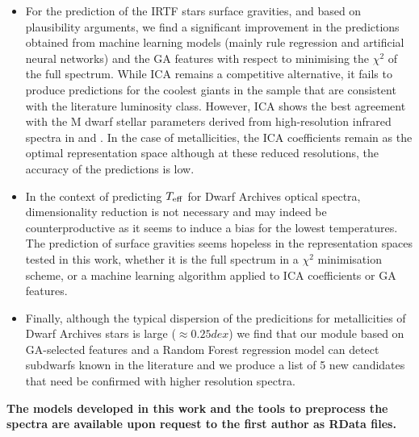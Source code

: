 \begin{itemize}
\item For the prediction of the IRTF stars surface gravities, and
  based on plausibility arguments, we find a significant improvement
  in the predictions obtained from machine learning models (mainly
  rule regression and artificial neural networks) and the GA features
  with respect to minimising the $\chi^2$ of the full spectrum. While
  ICA remains a competitive alternative, it fails to produce
  predictions for the coolest giants in the sample that are consistent
  with the literature luminosity class. However, ICA shows the best
  agreement with the M dwarf stellar parameters derived from
  high-resolution infrared spectra in \cite{esm1} and \cite{esm2}. In
  the case of metallicities, the ICA coefficients remain as the
  optimal representation space although at these reduced resolutions,
  the accuracy of the predictions is low.

\item In the context of predicting $T_{\rm eff}$ for Dwarf Archives
  optical spectra, dimensionality reduction is not necessary and may
  indeed be counterproductive as it seems to induce a bias for the
  lowest temperatures.  The prediction of surface gravities seems
  hopeless in the representation spaces tested in this work, whether
  it is the full spectrum in a $\chi^2$ minimisation scheme, or a
  machine learning algorithm applied to ICA coefficients or GA
  features.

\item Finally, although the typical dispersion of the predicitions for
  metallicities of Dwarf Archives stars is large ($\approx 0.25 dex$)
  we find that our module based on GA-selected features and a Random
  Forest regression model can detect subdwarfs known in the literature
  and we produce a list of 5 new candidates that need be confirmed
  with higher resolution spectra.

\end{itemize}


{\bf The models developed in this work and the tools to preprocess the
  spectra are available upon request to the first author as RData
  files.}
